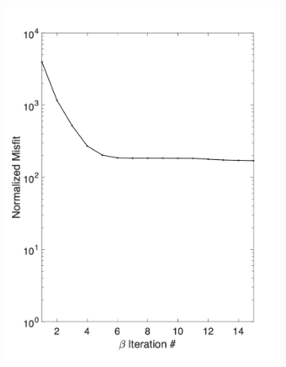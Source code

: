 \documentclass[final,authoryear,5p,times,twocolumn]{elsarticle}
\begin{document}
\begin{figure}[!ht]
   \centering
   \begin{subfigure}[b]{0.475\linewidth}
       \centering
       \includegraphics[trim=0.5cm 0.5cm 1.7cm 1cm, clip=true, width=\linewidth]{./Figures/Fig4a.png}
       \caption{}
       \label{fig:DataQC_FullMisfitCurve}
   \end{subfigure}
   \hfill
   \begin{subfigure}[b]{0.475\linewidth}
       \centering

\end{subfigure}
\end{figure}
\end{document}
